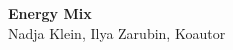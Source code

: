 \documentclass[a4paper,12pt]{scrartcl} %
\begin{document}




\begin{titlepage}

\thispagestyle{empty}   %


\begin{center}
\vspace*{2.cm}
{\textbf{\large{Energy Mix}}} \\
\vspace*{2cm}
Nadja Klein, Ilya Zarubin, Koautor\\

\end{center}


\vfill
\begin{flushright}
   \vspace*{0.5cm}
\end{flushright}


\end{titlepage}

\clearpage                %




\clearpage
\clearpage

%
%
%
%
%
\setcounter{page}{1}        %
%
%
%
%
%
\end{document}
